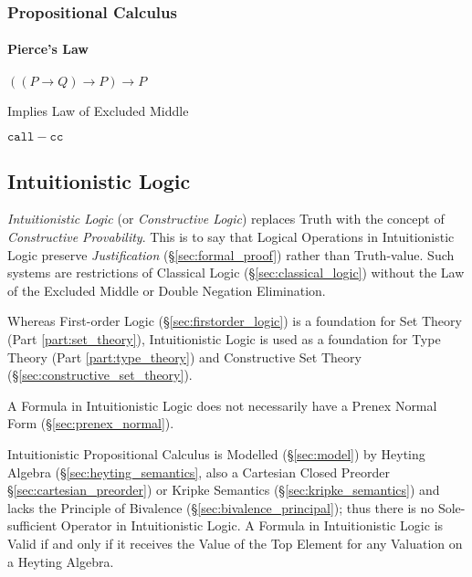 \subsubsection{Propositional Calculus}
\label{sec:propositional_calculus}

\paragraph{Pierce's Law}\label{sec:pierces_law}\hfill

$((P \rightarrow Q) \rightarrow P) \rightarrow P$

Implies Law of Excluded Middle

$\mathtt{call-cc}$ %



\subsection{Intuitionistic Logic}\label{sec:intuitionistic_logic}

\emph{Intuitionistic Logic} (or \emph{Constructive Logic}) replaces
Truth with the concept of \emph{Constructive Provability}. This is to
say that Logical Operations in Intuitionistic Logic preserve
\emph{Justification} (\S\ref{sec:formal_proof}) rather than
Truth-value. Such systems are restrictions of Classical Logic
(\S\ref{sec:classical_logic}) without the Law of the Excluded Middle
or Double Negation Elimination.

Whereas First-order Logic (\S\ref{sec:firstorder_logic}) is a
foundation for Set Theory (Part \ref{part:set_theory}), Intuitionistic
Logic is used as a foundation for Type Theory (Part
\ref{part:type_theory}) and Constructive Set Theory
(\S\ref{sec:constructive_set_theory}).

A Formula in Intuitionistic Logic does not necessarily have a Prenex
Normal Form (\S\ref{sec:prenex_normal}).

Intuitionistic Propositional Calculus is Modelled (\S\ref{sec:model})
by Heyting Algebra (\S\ref{sec:heyting_semantics}, also a Cartesian
Closed Preorder \S\ref{sec:cartesian_preorder}) or Kripke Semantics
(\S\ref{sec:kripke_semantics}) and lacks the Principle of Bivalence
(\S\ref{sec:bivalence_principal}); thus there is no Sole-sufficient
Operator in Intuitionistic Logic. A Formula in Intuitionistic Logic is
Valid if and only if it receives the Value of the Top Element for any
Valuation on a Heyting Algebra.

